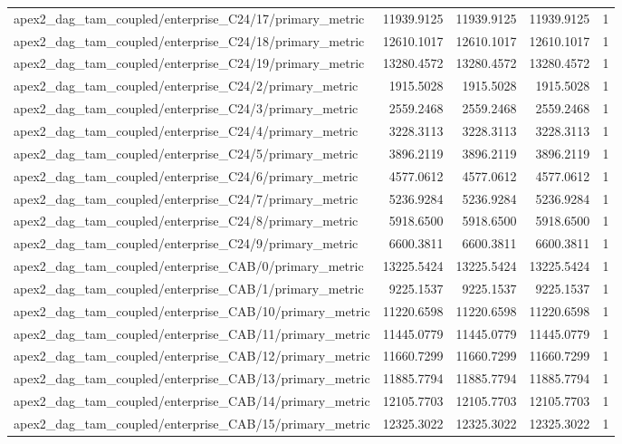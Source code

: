 \begin{table}[h]
\begin{tabular}{lrrrr}
apex2_dag_tam_coupled/enterprise_C24/17/primary_metric & 11939.9125 & 11939.9125 & 11939.9125 & 1 \\
apex2_dag_tam_coupled/enterprise_C24/18/primary_metric & 12610.1017 & 12610.1017 & 12610.1017 & 1 \\
apex2_dag_tam_coupled/enterprise_C24/19/primary_metric & 13280.4572 & 13280.4572 & 13280.4572 & 1 \\
apex2_dag_tam_coupled/enterprise_C24/2/primary_metric & 1915.5028 & 1915.5028 & 1915.5028 & 1 \\
apex2_dag_tam_coupled/enterprise_C24/3/primary_metric & 2559.2468 & 2559.2468 & 2559.2468 & 1 \\
apex2_dag_tam_coupled/enterprise_C24/4/primary_metric & 3228.3113 & 3228.3113 & 3228.3113 & 1 \\
apex2_dag_tam_coupled/enterprise_C24/5/primary_metric & 3896.2119 & 3896.2119 & 3896.2119 & 1 \\
apex2_dag_tam_coupled/enterprise_C24/6/primary_metric & 4577.0612 & 4577.0612 & 4577.0612 & 1 \\
apex2_dag_tam_coupled/enterprise_C24/7/primary_metric & 5236.9284 & 5236.9284 & 5236.9284 & 1 \\
apex2_dag_tam_coupled/enterprise_C24/8/primary_metric & 5918.6500 & 5918.6500 & 5918.6500 & 1 \\
apex2_dag_tam_coupled/enterprise_C24/9/primary_metric & 6600.3811 & 6600.3811 & 6600.3811 & 1 \\
apex2_dag_tam_coupled/enterprise_CAB/0/primary_metric & 13225.5424 & 13225.5424 & 13225.5424 & 1 \\
apex2_dag_tam_coupled/enterprise_CAB/1/primary_metric & 9225.1537 & 9225.1537 & 9225.1537 & 1 \\
apex2_dag_tam_coupled/enterprise_CAB/10/primary_metric & 11220.6598 & 11220.6598 & 11220.6598 & 1 \\
apex2_dag_tam_coupled/enterprise_CAB/11/primary_metric & 11445.0779 & 11445.0779 & 11445.0779 & 1 \\
apex2_dag_tam_coupled/enterprise_CAB/12/primary_metric & 11660.7299 & 11660.7299 & 11660.7299 & 1 \\
apex2_dag_tam_coupled/enterprise_CAB/13/primary_metric & 11885.7794 & 11885.7794 & 11885.7794 & 1 \\
apex2_dag_tam_coupled/enterprise_CAB/14/primary_metric & 12105.7703 & 12105.7703 & 12105.7703 & 1 \\
apex2_dag_tam_coupled/enterprise_CAB/15/primary_metric & 12325.3022 & 12325.3022 & 12325.3022 & 1 \\

\end{tabular}
\end{table}
